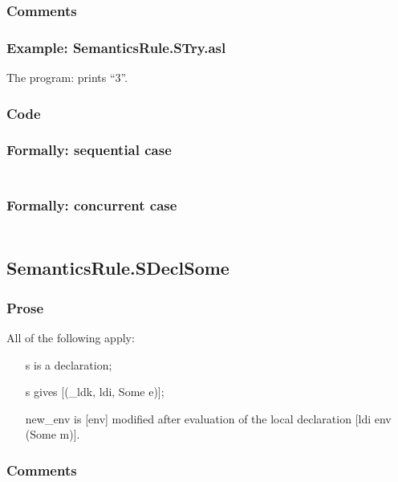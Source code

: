 \documentclass{book}
\begin{document}
    \subsubsection{Comments}

    \subsubsection{Example: SemanticsRule.STry.asl}
    The program:
    prints ``3''.

  \subsubsection{Code}

  \subsubsection{Formally: sequential case}
  \begin{align}
  \end{align} 

  \subsubsection{Formally: concurrent case}
  \begin{align}
  \end{align} 

\subsection{SemanticsRule.SDeclSome \label{sec:SemanticsRule.SDeclSome}}

    \subsubsection{Prose}
    All of the following apply:
    \begin{itemize}
    \item [s] is a declaration;
    \item [s] gives [(\_ldk, ldi, Some e)];
    \item [new\_env] is [env] modified after evaluation of the local declaration
      [ldi env (Some m)].
    \end{itemize}

    \subsubsection{Comments}
\end{document}

